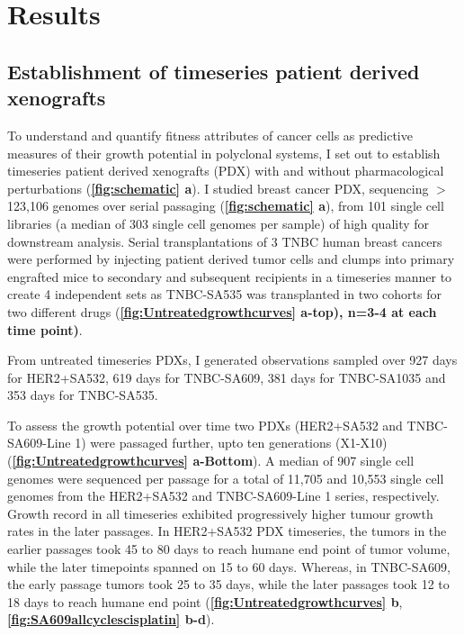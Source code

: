 \section{Results}

\subsection{Establishment of timeseries patient derived xenografts}

To understand and quantify fitness attributes of cancer cells as  predictive measures of their growth potential in polyclonal systems, I set out to establish timeseries patient derived xenografts (PDX) with and without pharmacological perturbations (\textbf{\autoref{fig:schematic} a}). I studied breast cancer PDX, sequencing $>$123,106 genomes over serial passaging (\textbf{\autoref{fig:schematic} a}), from 101 single cell libraries (a median of 303 single cell genomes per sample) of high quality for downstream analysis. 
Serial transplantations of 3 TNBC human breast cancers were performed by injecting patient derived tumor cells and clumps into primary engrafted mice to secondary and subsequent recipients in a timeseries manner to create 4 independent sets as TNBC-SA535 was transplanted in two cohorts for two different drugs (\textbf{\autoref{fig:Untreatedgrowthcurves} a-top), n=3-4 at each time point)}. 

From untreated timeseries PDXs, I generated observations sampled over 927 days for HER2+SA532, 619 days for TNBC-SA609, 381 days for TNBC-SA1035 and 353 days for TNBC-SA535. 

To assess the growth potential over time two PDXs (HER2+SA532 and TNBC-SA609-Line 1) were passaged further, upto ten generations (X1-X10)
 (\textbf{\autoref{fig:Untreatedgrowthcurves} a-Bottom}).
 A median of 907 single cell genomes were sequenced per passage for a total of 11,705 and 10,553 single cell genomes from the HER2+SA532 and TNBC-SA609-Line 1 series, respectively. 
Growth record in all timeseries exhibited progressively higher tumour growth rates in the later passages. In HER2+SA532 PDX timeseries, the tumors in the earlier passages took 45 to 80 days to reach humane end point of tumor volume, while the later timepoints spanned on 15 to 60 days. Whereas, in TNBC-SA609, the early passage tumors took 25 to 35 days, while the later passages took 12 to 18 days to reach humane end point (\textbf{\autoref{fig:Untreatedgrowthcurves} b}, \textbf{\autoref{fig:SA609allcyclescisplatin} b-d}).

